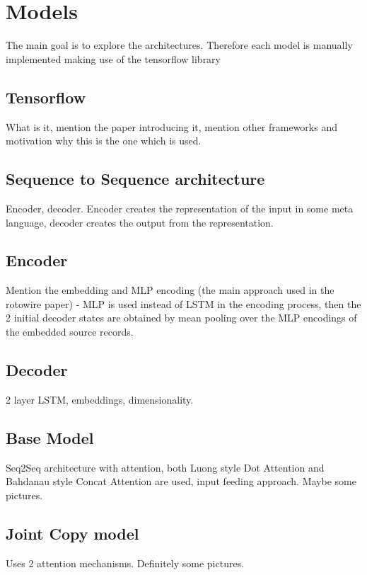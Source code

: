 \chapter{Models}
The main goal is to explore the architectures. Therefore each model is manually implemented making use of the tensorflow library

\section{Tensorflow}
What is it, mention the paper introducing it, mention other frameworks and motivation why this is the one which is used.

\section{Sequence to Sequence architecture}
Encoder, decoder. Encoder creates the representation of the input in some meta language, decoder creates the output from the representation.

\section{Encoder}
Mention the embedding and MLP encoding (the main approach used in the rotowire paper) - MLP is used instead of LSTM in the encoding process, then the 2 initial decoder states are obtained by mean pooling over the MLP encodings of the embedded source records.

\section{Decoder}
2 layer LSTM, embeddings, dimensionality.

\section{Base Model}
Seq2Seq architecture with attention, both Luong style Dot Attention and Bahdanau style Concat Attention are used, input feeding approach. Maybe some pictures.

\section{Joint Copy model}
Uses 2 attention mechanisms. Definitely some pictures.
